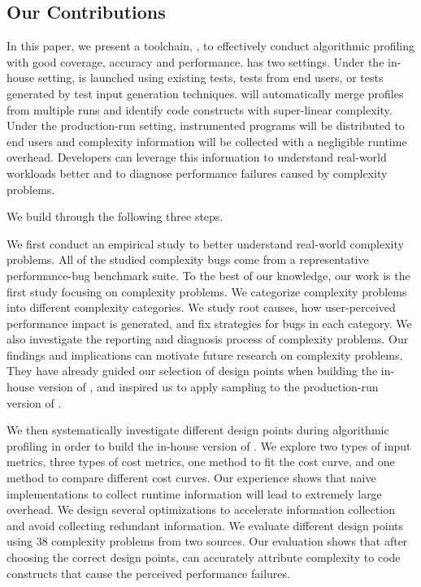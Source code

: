 \subsection{Our Contributions}
\label{sec:con}

In this paper,
we present a toolchain, \Tool, to effectively conduct algorithmic profiling with
good coverage, accuracy and performance.
\Tool has two settings. %
Under the in-house setting,
\Tool is launched using existing tests, tests from end users,
or tests generated by test input generation techniques\cite{KLEE,s2e,dart,EventBreak}.
\Tool will automatically merge profiles from multiple runs and
identify code constructs with super-linear complexity.
Under the production-run setting,
instrumented programs will be distributed to end users
and complexity information will be collected with a negligible runtime overhead.
Developers can leverage this information to understand real-world workloads better
and to diagnose performance failures caused by complexity problems.


We build \Tool through the following three steps.

We first conduct an empirical study to better understand
real-world complexity problems.
All of the studied complexity bugs come from a representative
performance-bug benchmark suite\cite{PerfBug,SongOOPSLA2014}.
To the best of our knowledge, our work is the first study focusing on complexity problems.
We categorize complexity problems into different complexity categories.
We study root causes,
how user-perceived performance impact is generated,
and fix strategies for bugs in each category.
We also investigate the reporting and diagnosis process of complexity problems.
Our findings and implications can motivate future research on complexity problems.
They have already guided our selection of design points when building the in-house version of \Tool,
and inspired us to apply sampling to the production-run version of \Tool.

We then systematically investigate different design points during algorithmic profiling
in order to build the in-house version of \Tool.
We explore two types of input metrics,
three types of cost metrics,
one method to fit the cost curve,
and one method to compare different cost curves.
Our experience shows that naive implementations
to collect runtime information
will lead to extremely large overhead.
We design several optimizations to accelerate information collection
and avoid collecting redundant information.
We evaluate different design points
using $38$ complexity problems from two sources.
Our evaluation shows that after choosing the correct design points,
\Tool can accurately attribute complexity to code constructs
that cause the perceived performance failures.


